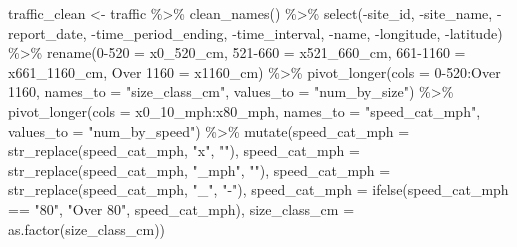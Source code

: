 \documentclass[
  10pt,
  letterpaper,
]{article}
\newenvironment{Shaded}{\begin{snugshade}}{\end{snugshade}}
\newcommand{\AttributeTok}[1]{\textcolor[rgb]{0.40,0.45,0.13}{#1}}
\newcommand{\FunctionTok}[1]{\textcolor[rgb]{0.28,0.35,0.67}{#1}}
\newcommand{\NormalTok}[1]{\textcolor[rgb]{0.00,0.23,0.31}{#1}}
\newcommand{\OtherTok}[1]{\textcolor[rgb]{0.00,0.23,0.31}{#1}}
\newcommand{\SpecialCharTok}[1]{\textcolor[rgb]{0.37,0.37,0.37}{#1}}
\newcommand{\StringTok}[1]{\textcolor[rgb]{0.13,0.47,0.30}{#1}}
\begin{document}
\begin{Shaded}
\begin{Highlighting}[]
\NormalTok{traffic\_clean }\OtherTok{\textless{}{-}}\NormalTok{ traffic }\SpecialCharTok{\%\textgreater{}\%} \FunctionTok{clean\_names}\NormalTok{() }\SpecialCharTok{\%\textgreater{}\%} 
  \FunctionTok{select}\NormalTok{(}\SpecialCharTok{{-}}\NormalTok{site\_id, }\SpecialCharTok{{-}}\NormalTok{site\_name, }\SpecialCharTok{{-}}\NormalTok{report\_date, }\SpecialCharTok{{-}}\NormalTok{time\_period\_ending, }\SpecialCharTok{{-}}\NormalTok{time\_interval,}
         \SpecialCharTok{{-}}\NormalTok{name, }\SpecialCharTok{{-}}\NormalTok{longitude, }\SpecialCharTok{{-}}\NormalTok{latitude) }\SpecialCharTok{\%\textgreater{}\%} 
  \FunctionTok{rename}\NormalTok{(}\StringTok{\textasciigrave{}}\AttributeTok{0{-}520}\StringTok{\textasciigrave{}} \OtherTok{=}\NormalTok{ x0\_520\_cm,}
         \StringTok{\textasciigrave{}}\AttributeTok{521{-}660}\StringTok{\textasciigrave{}} \OtherTok{=}\NormalTok{ x521\_660\_cm,}
         \StringTok{\textasciigrave{}}\AttributeTok{661{-}1160}\StringTok{\textasciigrave{}} \OtherTok{=}\NormalTok{ x661\_1160\_cm,}
         \StringTok{\textasciigrave{}}\AttributeTok{Over 1160}\StringTok{\textasciigrave{}} \OtherTok{=}\NormalTok{ x1160\_cm) }\SpecialCharTok{\%\textgreater{}\%} 
  \FunctionTok{pivot\_longer}\NormalTok{(}\AttributeTok{cols =} \StringTok{\textasciigrave{}}\AttributeTok{0{-}520}\StringTok{\textasciigrave{}}\SpecialCharTok{:}\StringTok{\textasciigrave{}}\AttributeTok{Over 1160}\StringTok{\textasciigrave{}}\NormalTok{,}
               \AttributeTok{names\_to =} \StringTok{"size\_class\_cm"}\NormalTok{,}
               \AttributeTok{values\_to =} \StringTok{"num\_by\_size"}\NormalTok{) }\SpecialCharTok{\%\textgreater{}\%} 
  \FunctionTok{pivot\_longer}\NormalTok{(}\AttributeTok{cols =}\NormalTok{ x0\_10\_mph}\SpecialCharTok{:}\NormalTok{x80\_mph,}
               \AttributeTok{names\_to =} \StringTok{"speed\_cat\_mph"}\NormalTok{,}
               \AttributeTok{values\_to =} \StringTok{"num\_by\_speed"}\NormalTok{) }\SpecialCharTok{\%\textgreater{}\%} 
  \FunctionTok{mutate}\NormalTok{(}\AttributeTok{speed\_cat\_mph =} \FunctionTok{str\_replace}\NormalTok{(speed\_cat\_mph, }\StringTok{"x"}\NormalTok{, }\StringTok{""}\NormalTok{),}
         \AttributeTok{speed\_cat\_mph =} \FunctionTok{str\_replace}\NormalTok{(speed\_cat\_mph, }\StringTok{"\_mph"}\NormalTok{, }\StringTok{""}\NormalTok{),}
         \AttributeTok{speed\_cat\_mph =} \FunctionTok{str\_replace}\NormalTok{(speed\_cat\_mph, }\StringTok{"\_"}\NormalTok{, }\StringTok{"{-}"}\NormalTok{), }
         \AttributeTok{speed\_cat\_mph =} \FunctionTok{ifelse}\NormalTok{(speed\_cat\_mph }\SpecialCharTok{==} \StringTok{"80"}\NormalTok{, }\StringTok{"Over 80"}\NormalTok{, speed\_cat\_mph),}
         \AttributeTok{size\_class\_cm =} \FunctionTok{as.factor}\NormalTok{(size\_class\_cm)) }
\end{Highlighting}
\end{Shaded}
\end{document}
